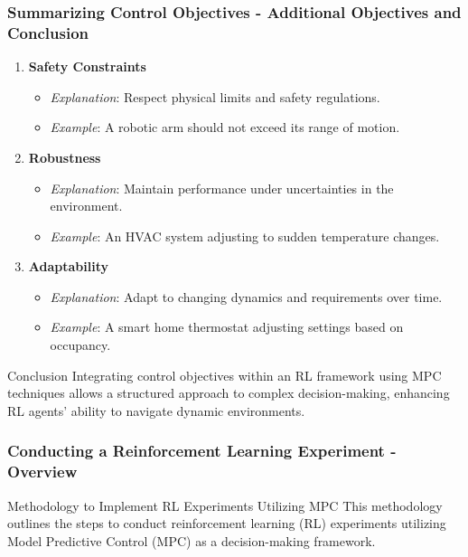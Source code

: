 \documentclass[aspectratio=169]{beamer}
\begin{document}
\begin{frame}[fragile]
    \frametitle{Summarizing Control Objectives - Additional Objectives and Conclusion}
    \begin{enumerate}[resume]
        \item \textbf{Safety Constraints}
            \begin{itemize}
                \item \textit{Explanation}: Respect physical limits and safety regulations.
                \item \textit{Example}: A robotic arm should not exceed its range of motion.
            \end{itemize}
        
        \item \textbf{Robustness}
            \begin{itemize}
                \item \textit{Explanation}: Maintain performance under uncertainties in the environment.
                \item \textit{Example}: An HVAC system adjusting to sudden temperature changes.
            \end{itemize}
        
        \item \textbf{Adaptability}
            \begin{itemize}
                \item \textit{Explanation}: Adapt to changing dynamics and requirements over time.
                \item \textit{Example}: A smart home thermostat adjusting settings based on occupancy.
            \end{itemize}
    \end{enumerate}
    
    \begin{block}{Conclusion}
        Integrating control objectives within an RL framework using MPC techniques allows a structured approach to complex decision-making, enhancing RL agents' ability to navigate dynamic environments.
    \end{block}
\end{frame}

\begin{frame}[fragile]
    \frametitle{Conducting a Reinforcement Learning Experiment - Overview}
    \begin{block}{Methodology to Implement RL Experiments Utilizing MPC}
        This methodology outlines the steps to conduct reinforcement learning (RL) experiments utilizing Model Predictive Control (MPC) as a decision-making framework.
    \end{block}
\end{frame}
\end{document}
